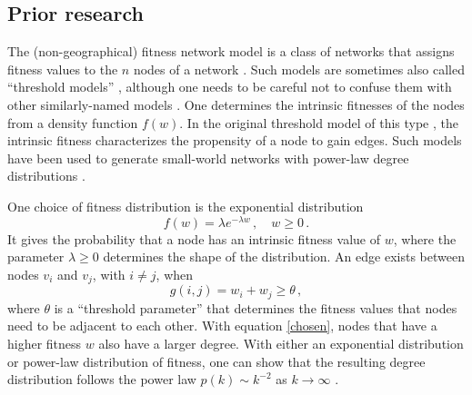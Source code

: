 \documentclass[%
 reprint,
 amsmath,amssymb,
 aps,
]{revtex4-1}
\begin{document}
\subsection{Prior research}

The (non-geographical) fitness network model is a class of networks that assigns fitness values to the $n$ nodes of a network \cite{yusuke}. Such models are sometimes also called ``threshold models'' \cite{geographical_threshold}, although one needs to be careful not to confuse them with other similarly-named models \cite{porter2016dynamical,newman2018}. One determines the intrinsic fitnesses of the nodes from a density function $f(w)$. In the original threshold model of this type \cite{caldarelli}, the intrinsic fitness characterizes the propensity of a node to gain edges. Such models have been used to generate small-world networks with power-law degree distributions \cite{geographical_threshold}.

One choice of fitness distribution is the exponential distribution
\begin{equation}\label{exponentialfitness}
    f(w) = \lambda e^{-\lambda w}\,, \quad w \geq 0\,.
\end{equation}
It gives the probability that a node has an intrinsic fitness value of $w$, where the parameter $\lambda \geq 0$ determines the shape of the distribution. An edge exists between nodes $v_i$ and $v_j$, with $i \neq j$, when 
\begin{equation} \label{chosen}
    g(i,j) = w_i + w_j \geq \theta \,,
\end{equation}
where $\theta$ is a ``threshold parameter'' that determines the fitness values that nodes need to be adjacent to each other. With equation \eqref{chosen}, nodes that have a higher fitness $w$ also have a larger degree. With either an exponential distribution or power-law distribution of fitness, one can show that the resulting degree distribution follows the power law $p(k) \sim k^{-2}$ as $k \rightarrow \infty$ \cite{caldarelli, threshold}.
\end{document}
